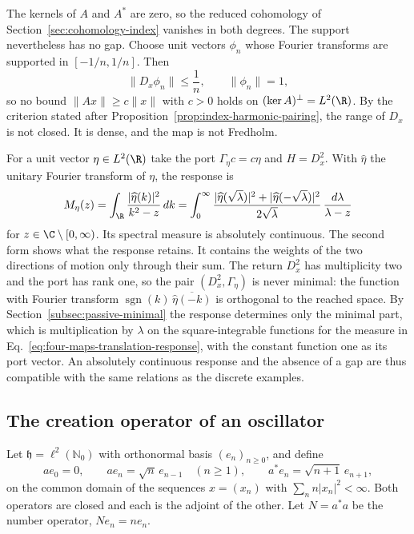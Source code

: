 The kernels of $A$ and $A^*$ are zero, so the reduced cohomology of Section~\ref{sec:cohomology-index} vanishes in both degrees. The support nevertheless has no gap. Choose unit vectors $\phi_n$ whose Fourier transforms are supported in $[-1/n,1/n]$. Then
\begin{equation}
 \|D_x\phi_n\|\le\frac1n,\qquad\|\phi_n\|=1 ,
 \label{eq:four-maps-translation-no-gap}
\end{equation}
so no bound $\|Ax\|\ge c\|x\|$ with $c>0$ holds on $(\ker A)^\perp=L^2(\R)$. By the criterion stated after Proposition~\ref{prop:index-harmonic-pairing}, the range of $D_x$ is not closed. It is dense, and the map is not Fredholm.

For a unit vector $\eta\in L^2(\R)$ take the port $\Gamma_\eta c=c\eta$ and $H=D_x^2$. With $\widehat\eta$ the unitary Fourier transform of $\eta$, the response is
\begin{equation}
 M_\eta(z)=\int_\R\frac{|\widehat\eta(k)|^2}{k^2-z}\,dk
   =\int_0^\infty\frac{|\widehat\eta(\sqrt\lambda)|^2+|\widehat\eta(-\sqrt\lambda)|^2}{2\sqrt\lambda}\,\frac{d\lambda}{\lambda-z}
 \label{eq:four-maps-translation-response}
\end{equation}
for $z\in\C\setminus[0,\infty)$.
Its spectral measure is absolutely continuous. The second form shows what the response retains. It contains the weights of the two directions of motion only through their sum. The return $D_x^2$ has multiplicity two and the port has rank one, so the pair $(D_x^2,\Gamma_\eta)$ is never minimal: the function with Fourier transform $\operatorname{sgn}(k)\,\overline{\widehat\eta(-k)}$ is orthogonal to the reached space. By Section~\ref{subsec:passive-minimal} the response determines only the minimal part, which is multiplication by $\lambda$ on the square-integrable functions for the measure in Eq.~\eqref{eq:four-maps-translation-response}, with the constant function one as its port vector. An absolutely continuous response and the absence of a gap are thus compatible with the same relations as the discrete examples.

\subsection{The creation operator of an oscillator}
\label{subsec:four-maps-oscillator}

Let $\mathfrak h=\ell^2(\mathbb N_0)$ with orthonormal basis $(e_n)_{n\ge0}$, and define
\begin{equation}
 ae_0=0,\qquad ae_n=\sqrt n\,e_{n-1}\quad(n\ge1),\qquad a^*e_n=\sqrt{n+1}\,e_{n+1},
 \label{eq:four-maps-ladder}
\end{equation}
on the common domain of the sequences $x=(x_n)$ with $\sum_nn|x_n|^2<\infty$. Both operators are closed and each is the adjoint of the other. Let $N=a^*a$ be the number operator, $Ne_n=ne_n$.

